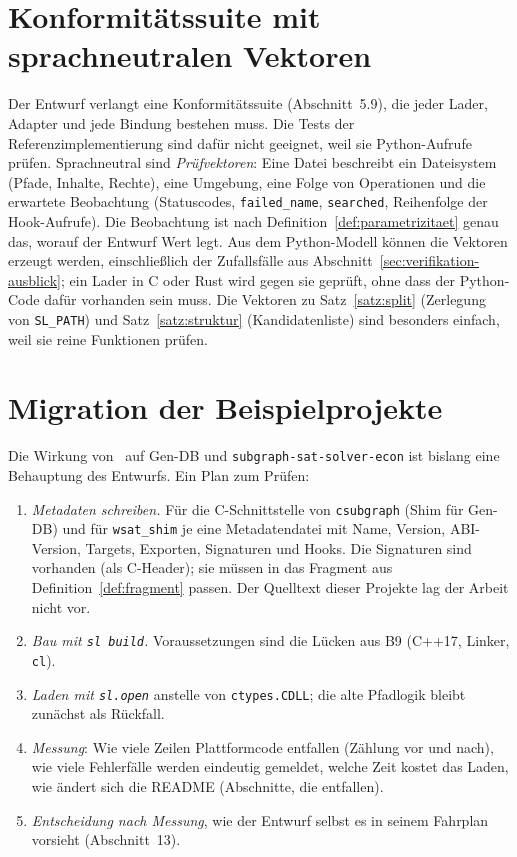 \section{Konformitätssuite mit sprachneutralen Vektoren}
\label{sec:konformitaet-ausblick}

Der Entwurf verlangt eine Konformitätssuite (Abschnitt~5.9), die jeder Lader, Adapter und jede Bindung bestehen muss. Die Tests der Referenzimplementierung sind dafür nicht geeignet, weil sie Python-Aufrufe prüfen. Sprachneutral sind \emph{Prüfvektoren}: Eine Datei beschreibt ein Dateisystem (Pfade, Inhalte, Rechte), eine Umgebung, eine Folge von Operationen und die erwartete Beobachtung (Statuscodes, \texttt{failed\_name}, \texttt{searched}, Reihenfolge der Hook-Aufrufe). Die Beobachtung ist nach Definition~\ref{def:parametrizitaet} genau das, worauf der Entwurf Wert legt. Aus dem Python-Modell können die Vektoren erzeugt werden, einschließlich der Zufallsfälle aus Abschnitt~\ref{sec:verifikation-ausblick}; ein Lader in C oder Rust wird gegen sie geprüft, ohne dass der Python-Code dafür vorhanden sein muss. Die Vektoren zu Satz~\ref{satz:split} (Zerlegung von \texttt{SL\_PATH}) und Satz~\ref{satz:struktur} (Kandidatenliste) sind besonders einfach, weil sie reine Funktionen prüfen.

\section{Migration der Beispielprojekte}
\label{sec:migration}

Die Wirkung von \SL\ auf Gen-DB und \texttt{subgraph-sat-solver-econ} ist bislang eine Behauptung des Entwurfs. Ein Plan zum Prüfen:

\begin{enumerate}
	\item \emph{Metadaten schreiben.} Für die C-Schnittstelle von \texttt{csubgraph} (Shim für Gen-DB) und für \texttt{wsat\_shim} je eine Metadatendatei mit Name, Version, ABI-Version, Targets, Exporten, Signaturen und Hooks. Die Signaturen sind vorhanden (als C-Header); sie müssen in das Fragment aus Definition~\ref{def:fragment} passen. Der Quelltext dieser Projekte lag der Arbeit nicht vor.
	\item \emph{Bau mit \texttt{sl build}.} Voraussetzungen sind die Lücken aus B9 (C++17, Linker, \texttt{cl}).
	\item \emph{Laden mit \texttt{sl.open}} anstelle von \texttt{ctypes.CDLL}; die alte Pfadlogik bleibt zunächst als Rückfall.
	\item \emph{Messung}: Wie viele Zeilen Plattformcode entfallen (Zählung vor und nach), wie viele Fehlerfälle werden eindeutig gemeldet, welche Zeit kostet das Laden, wie ändert sich die README (Abschnitte, die entfallen).
	\item \emph{Entscheidung nach Messung}, wie der Entwurf selbst es in seinem Fahrplan vorsieht (Abschnitt~13).
\end{enumerate}

